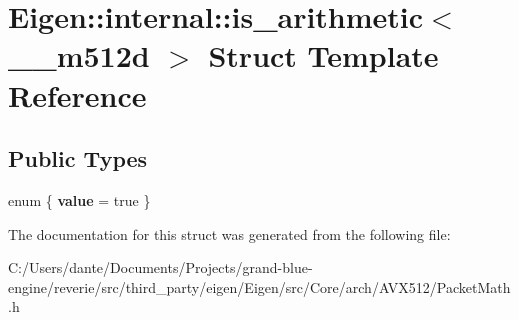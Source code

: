 \hypertarget{struct_eigen_1_1internal_1_1is__arithmetic_3_01____m512d_01_4}{}\section{Eigen\+::internal\+::is\+\_\+arithmetic$<$ \+\_\+\+\_\+m512d $>$ Struct Template Reference}
\label{struct_eigen_1_1internal_1_1is__arithmetic_3_01____m512d_01_4}
\subsection*{Public Types}
\begin{DoxyCompactItemize}
\item 
\mbox{\label{struct_eigen_1_1internal_1_1is__arithmetic_3_01____m512d_01_4_aeb0228a5a1510c2ff6df0ebdf9a9dae7}} 
enum \{ {\bfseries value} = true
 \}
\end{DoxyCompactItemize}


The documentation for this struct was generated from the following file\+:\begin{DoxyCompactItemize}
\item 
C\+:/\+Users/dante/\+Documents/\+Projects/grand-\/blue-\/engine/reverie/src/third\+\_\+party/eigen/\+Eigen/src/\+Core/arch/\+A\+V\+X512/Packet\+Math.\+h\end{DoxyCompactItemize}
